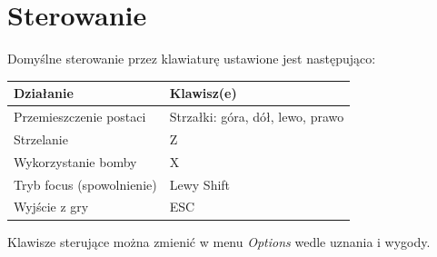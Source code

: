	\section{Sterowanie}
		Domyślne sterowanie przez klawiaturę ustawione jest następująco:
		\begin{center}
			\begin{tabular}{|p{5cm}|p{5cm}|}
				\hline \textbf{Działanie} & \textbf{Klawisz(e)} \\ 
				\hline Przemieszczenie postaci & Strzałki: góra, dół, lewo, prawo \\ 
				\hline Strzelanie & Z \\
				\hline Wykorzystanie bomby & X \\
				\hline Tryb focus (spowolnienie) & Lewy Shift\\
				\hline Wyjście z gry & ESC\\
				\hline
			\end{tabular}
		\end{center}
		Klawisze sterujące można zmienić w menu \emph{Options} wedle uznania i wygody.
